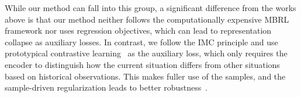 While our method can fall into this group, a significant difference from the works above is that our method neither follows the computationally expensive MBRL framework nor uses regression objectives, which can lead to representation collapse as auxiliary losses. In contrast, we follow the IMC principle and use prototypical contrastive learning~\citep{caron2020unsupervised, yarats2021reinforcement, deng2022dreamerpro} as the auxiliary loss, which only requires the encoder to distinguish how the current situation differs from other situations based on historical observations. This makes fuller use of the samples, and the sample-driven regularization leads to better robustness~\citep{lecun2022path}.

\begin{table}[t]
\centering
\vspace{-1cm}
\caption{Comparisons between our method and previous methods. Teacher-Student refers to~\citep{miki2022learning}, MONO means~\citep{agarwal2023legged}, AMP means Adversarial Motion Priors~\citep{wu2023learning, escontrela2022adversarial} and RMA means Rapid Motor Adaptation~\citep{kumar2021rma}. Current Env. Parameters indicate the elevation map, friction, restitution, \emph{etc.} in current frame.}


\end{table}
